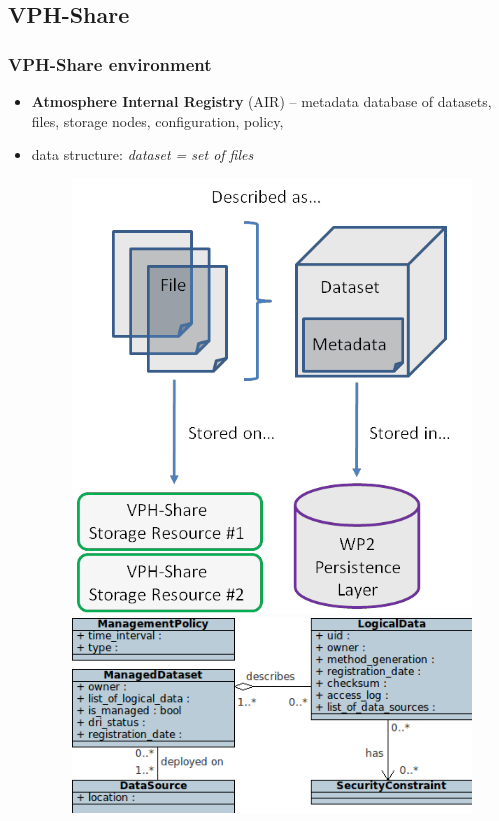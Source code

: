 \documentclass[compress]{beamer}
\begin{document}
\subsection{VPH-Share}
\begin{frame}
\frametitle{\textbf{VPH-Share environment}}
\begin{itemize}
	\item \textbf{Atmosphere Internal Registry} (AIR) -- metadata database of datasets, files, storage nodes, configuration, policy,
	\item data structure: \textit{dataset = set of files}
	\begin{figure}
		\centering
		\includegraphics[scale=0.15]{img/managed-dataset.png}
		\hspace{1cm}
		\includegraphics[scale=0.4]{img/data_model.png}
	\end{figure}
\end{itemize}


\end{frame}
\end{document}
